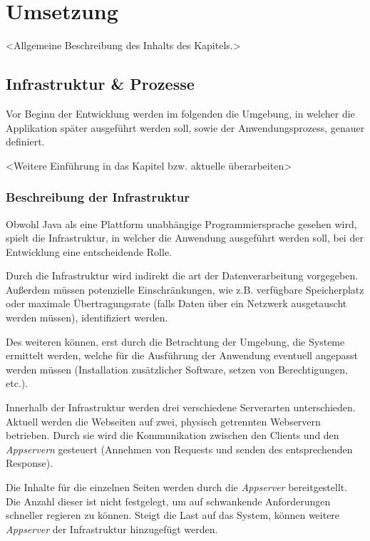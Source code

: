 
\chapter{Umsetzung}\label{cha:Umsetzung}
<Allgemeine Beschreibung des Inhalts des Kapitels.>

\section{Infrastruktur \& Prozesse}
Vor Beginn der Entwicklung werden im folgenden die Umgebung, in welcher die Applikation später ausgeführt werden soll, sowie der Anwendungsprozess, genauer definiert. 

<Weitere Einführung in das Kapitel bzw. aktuelle überarbeiten>

\subsection{Beschreibung der Infrastruktur}
Obwohl Java als eine Plattform unabhängige Programmiersprache gesehen wird, spielt die Infrastruktur, in welcher die Anwendung ausgeführt werden soll, bei der Entwicklung eine entscheidende Rolle.

Durch die Infrastruktur wird indirekt die art der Datenverarbeitung vorgegeben. Außerdem müssen potenzielle Einschränkungen, wie z.B. verfügbare Speicherplatz oder maximale Übertragungsrate (falls Daten über ein Netzwerk ausgetauscht werden müssen), identifiziert werden.

Des weiteren können, erst durch die Betrachtung der Umgebung, die Systeme ermittelt werden, welche für die Ausführung der Anwendung eventuell angepasst werden müssen (Installation zusätzlicher Software, setzen von Berechtigungen, etc.).

Innerhalb der Infrastruktur werden drei verschiedene Serverarten unterschieden. Aktuell werden die Webseiten auf zwei, physisch getrennten Webservern betrieben. Durch sie wird die Kommunikation zwischen den Clients und den \textit{Appservern} gesteuert (Annehmen von Requests und senden des entsprechenden Response).

Die Inhalte für die einzelnen Seiten werden durch die \textit{Appserver} bereitgestellt. Die Anzahl dieser ist nicht festgelegt, um auf schwankende Anforderungen schneller regieren zu können. Steigt die Last auf das System, können weitere \textit{Appserver} der Infrastruktur hinzugefügt werden.

